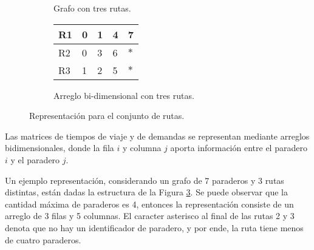 \begin{figure}[!htb]
\begin{subfigure}[b]{0.6\textwidth}
\caption{Grafo con tres rutas.}
\label{fig:grafo}
\end{subfigure}
\begin{subfigure}[b]{0.4\textwidth}
\begin{tabular}{|p{0.8cm}|p{0.8cm}|p{0.8cm}|p{0.8cm}|p{0.8cm}|}
\hline
R1 & 0 & 1 & 4 & 7\\
\hline
R2 & 0 & 3 & 6 & $*$\\
\hline
R3 & 1 & 2 & 5 & $*$\\
\hline
\end{tabular}
\caption{Arreglo bi-dimensional con tres rutas.}
\label{fig:tabla}
\end{subfigure}
\caption{Representación para el conjunto de rutas.}
\label{fig:repr1}
\end{figure}

Las matrices de tiempos de viaje y de demandas se representan mediante arreglos bidimensionales, donde la fila $i$ y columna $j$ aporta información entre el paradero $i$ y el paradero $j$.

Un ejemplo representación, considerando un grafo de 7 paraderos y 3 rutas distintas, están dadas la estructura de la Figura \ref{fig:repr1}. Se puede observar que la cantidad máxima de paraderos es 4, entonces la representación consiste de un arreglo de 3 filas y 5 columnas. El caracter asterisco al final de las rutas 2 y 3 denota que no hay un identificador de paradero, y por ende, la ruta tiene menos de cuatro paraderos.
